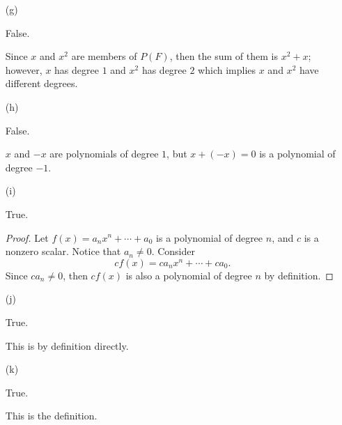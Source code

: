 \begin{Exercise}
\begin{enumerate}[(a)]
\item [(g)]
\begin{answer}
False.
\end{answer}
\begin{solution}
Since $x$ and $x^2$ are members of $P(F)$, then the sum of them is $x^2+x$; however, $x$ has degree $1$ and $x^2$ has degree $2$ which implies $x$ and $x^2$ have different degrees.
\end{solution}

\item [(h)]
\begin{answer}
False.
\end{answer}
\begin{solution}
$x$ and $-x$ are polynomials of degree $1$, but $x+(-x) = 0$ is a polynomial of degree $-1$.
\end{solution}

\item [(i)]
\begin{answer}
True.
\end{answer}
\begin{proof}
Let $f(x) = a_n x^n + \cdots + a_0$ is a polynomial of degree $n$, and $c$ is a nonzero scalar. Notice that $a_n \neq 0$. Consider 
$$
cf(x) = c a_n x^n + \cdots + c a_0.
$$
Since $c a_n \neq 0$, then $cf(x)$ is also a polynomial of degree $n$ by definition.
\end{proof}

\item [(j)]
\begin{answer}
True.
\end{answer}
\begin{solution}
This is by definition directly.
\end{solution}

\item [(k)]
\begin{answer}
True.
\end{answer}
\begin{solution}
This is the definition.
\end{solution}
\end{enumerate}
\end{Exercise}